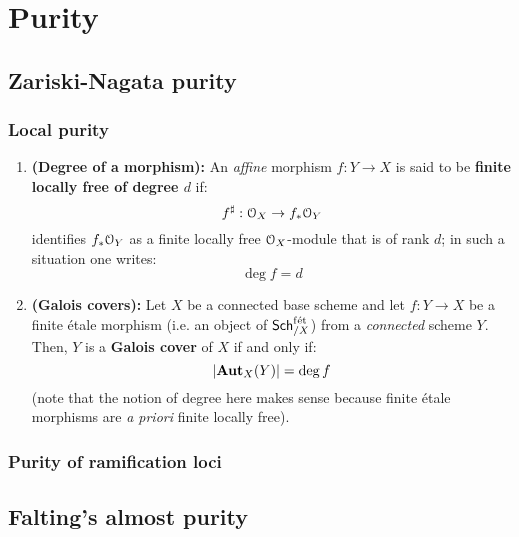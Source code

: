 \chapter{Purity}
    \begin{abstract}
        
    \end{abstract}
    
    \minitoc
    
    \section{Zariski-Nagata purity}
        \subsection{Local purity}
            \begin{definition} \label{def: galois_covers}
                \noindent
                \begin{enumerate}
                    \item \textbf{(Degree of a morphism):} An \textit{affine} morphism $f: Y \to X$ is said to be \textbf{finite locally free of degree $d$} if:
                        $$f^{\sharp}: \mathcal{O}_X \to f_*\mathcal{O}_Y$$
                    identifies $f_*\mathcal{O}_Y$ as a finite locally free $\mathcal{O}_X$-module that is of rank $d$; in such a situation one writes:
                        $$\deg f = d$$
                    \item \textbf{(Galois covers):} Let $X$ be a connected base scheme and let $f: Y \to X$ be a finite \'etale morphism (i.e. an object of $\mathsf{Sch}_{/X}^{\mathrm{f\acute{e}t}}$) from a \textit{connected} scheme $Y$. Then, $Y$ is a \textbf{Galois cover} of $X$ if and only if:
                        $$|\mathbf{Aut}_X(Y)| = \deg f$$
                    (note that the notion of degree here makes sense because finite \'etale morphisms are \textit{a priori} finite locally free).
                \end{enumerate}
            \end{definition}
        
        \subsection{Purity of ramification loci}
    
    \section{Falting's almost purity}
    
